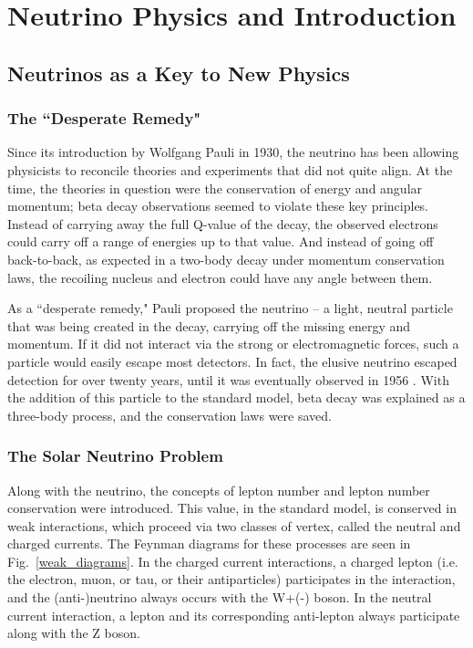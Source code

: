  
\chapter {Neutrino Physics and \nonubb Introduction}
\section{Neutrinos as a Key to New Physics}
\subsection{The ``Desperate Remedy"}
Since its introduction by Wolfgang Pauli in 1930, the neutrino has been allowing physicists to reconcile theories and experiments that did not quite align. At the time, the theories in question were the conservation of energy and angular momentum; beta decay observations seemed to violate these key principles. Instead of carrying away the full Q-value of the decay, the observed electrons could carry off a range of energies up to that value. And instead of going off back-to-back, as expected in a two-body decay under momentum conservation laws, the recoiling nucleus and electron could have any angle between them. 

As a ``desperate remedy," Pauli proposed the neutrino \cite{Pauli1930}-- a light, neutral particle that was being created in the decay, carrying off the missing energy and momentum. If it did not interact via the strong or electromagnetic forces, such a particle would easily escape most detectors. In fact, the elusive neutrino escaped detection for over twenty years, until it was eventually observed in 1956 \cite{Cowan1956}. With the addition of this particle to the standard model, beta decay was explained as a three-body process, and the conservation laws were saved.

\subsection{The Solar Neutrino Problem}
Along with the neutrino, the concepts of lepton number and lepton number conservation were introduced. This value, in the standard model, is conserved in weak interactions, which proceed via two classes of vertex, called the neutral and charged currents. The Feynman diagrams for these processes are seen in Fig.~\ref{weak_diagrams}. In the charged current interactions, a charged lepton (i.e. the electron, muon, or tau, or their antiparticles) participates in the interaction, and the (anti-)neutrino always occurs with the W+(-) boson. In the neutral current interaction, a lepton and its corresponding anti-lepton always participate along with the Z boson. 

